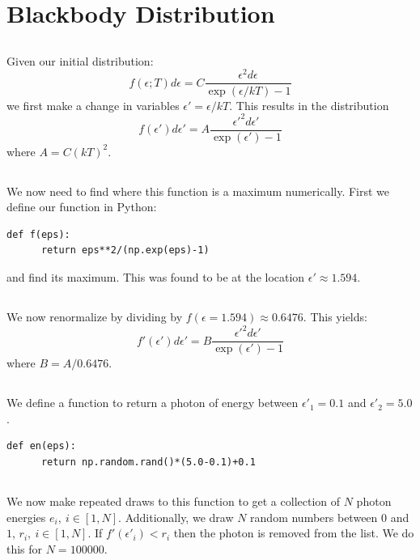 \documentclass[12pt,a4paper]{article}
\begin{document}
\section{Blackbody Distribution}
\subsection{}
Given our initial distribution:
\begin{equation*}
  f(\epsilon;T)d\epsilon = C\frac{\epsilon^2d\epsilon}{\exp{(\epsilon/kT)}-1}
\end{equation*}
we first make a change in variables $\epsilon' = \epsilon/kT$. This results
in the distribution
\begin{equation*}
  f(\epsilon')d\epsilon' = A\frac{\epsilon'^2d\epsilon'}{\exp{(\epsilon')}-1}
\end{equation*}
where $A=C(kT)^2$.
\subsection{}
We now need to find where this function is a maximum numerically. First we
define our function in Python:
\begin{lstlisting}[style=custompython]
  def f(eps):
      return eps**2/(np.exp(eps)-1)
\end{lstlisting}
and find its maximum. This was found to be at the 
location $\epsilon'\approx1.594$.
\subsection{}
We now renormalize by dividing by $f(\epsilon=1.594)\approx0.6476$.
This yields:
\begin{equation*}
  f'(\epsilon')d\epsilon' = B\frac{\epsilon'^2d\epsilon'}{\exp{(\epsilon')}-1}
\end{equation*}
where $B=A/0.6476$.
\subsection{}
We define a function to return a photon of energy between $\epsilon'_1=0.1$
and $\epsilon'_2=5.0$.
\begin{lstlisting}[style=custompython]
  def en(eps):
      return np.random.rand()*(5.0-0.1)+0.1
\end{lstlisting}
\subsection{}
We now make repeated draws to this function to get a collection of $N$
photon energies ${e_i},\ i\in[1,N]$. Additionally, we draw $N$ random
numbers between $0$ and $1$, ${r_i},\ i\in[1,N]$. If $f'(\epsilon'_i) < r_i$
then the photon is removed from the list. We do this for $N=100000$.
\end{document}
